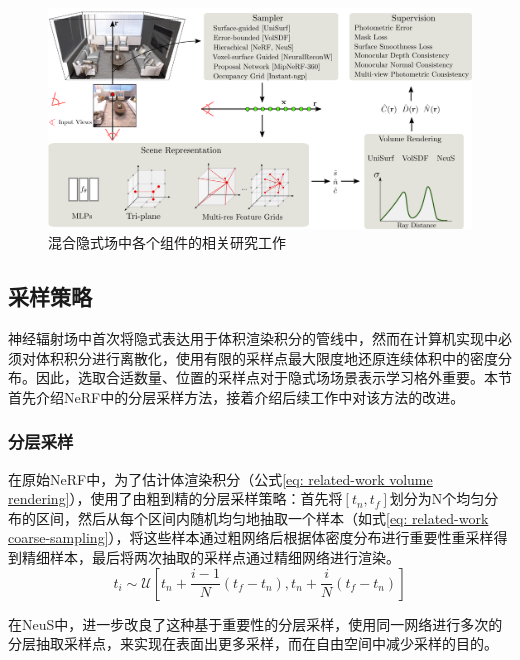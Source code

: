 \begin{figure}[t]
    \centering
    \includegraphics[width=\textwidth]{undergraduate-thesis/images/related-work/sdfstudio.png}
    \caption{混合隐式场中各个组件的相关研究工作\cite{yu_sdfstudio_2022}}
    \label{fig:related-work sdfstudio}
\end{figure}

\subsection{采样策略}
神经辐射场中首次将隐式表达用于体积渲染积分的管线中，然而在计算机实现中必须对体积积分进行离散化，使用有限的采样点最大限度地还原连续体积中的密度分布。因此，选取合适数量、位置的采样点对于隐式场场景表示学习格外重要。本节首先介绍NeRF\cite{mildenhall_nerf_2020}中的分层采样方法，接着介绍后续工作中对该方法的改进。

\subsubsection{分层采样}
\label{sec: coarse-to-fine sampling}
在原始NeRF中，为了估计体渲染积分（公式\ref{eq: related-work volume rendering}），使用了由粗到精的分层采样策略：首先将$[t_n,t_f]$划分为N个均匀分布的区间，然后从每个区间内随机均匀地抽取一个样本（如式\ref{eq: related-work coarse-sampling}），将这些样本通过粗网络后根据体密度分布进行重要性重采样得到精细样本，最后将两次抽取的采样点通过精细网络进行渲染。
\begin{equation}
    t_i\sim\mathcal{U}\left[t_n+\frac{i-1}{N}(t_f-t_n), t_n+\frac{i}{N}(t_f-t_n)\right]
    \label{eq: related-work coarse-sampling}
\end{equation}

在NeuS\cite{wang_neus_2021}中，进一步改良了这种基于重要性的分层采样，使用同一网络进行多次的分层抽取采样点，来实现在表面出更多采样，而在自由空间中减少采样的目的。


